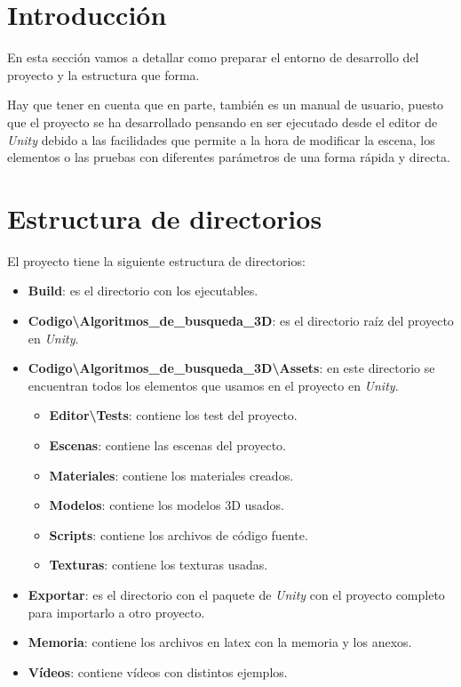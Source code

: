 
\section{Introducción}
En esta sección vamos a detallar como preparar el entorno de desarrollo del proyecto y la estructura que forma.

Hay que tener en cuenta que en parte, también es un manual de usuario, puesto que el proyecto se ha desarrollado pensando en ser ejecutado desde el editor de \textit{Unity} debido a las facilidades que permite a la hora de modificar la escena, los elementos o las pruebas con diferentes parámetros de una forma rápida y directa.

\section{Estructura de directorios}
El proyecto tiene la siguiente estructura de directorios:

\begin{itemize}
\item \textbf{Build}: es el directorio con los ejecutables.
\item \textbf{Codigo\textbackslash Algoritmos\_de\_busqueda\_3D}: es el directorio raíz del proyecto en \textit{Unity}.
\item \textbf{Codigo\textbackslash Algoritmos\_de\_busqueda\_3D\textbackslash Assets}: en este directorio se encuentran todos los elementos que usamos en el proyecto en \textit{Unity}.
	\begin{itemize}
	\item \textbf{Editor\textbackslash Tests}: contiene los test del proyecto.
	\item \textbf{Escenas}: contiene las escenas del proyecto.
	\item \textbf{Materiales}: contiene los materiales creados.
	\item \textbf{Modelos}: contiene los modelos 3D usados.
	\item \textbf{Scripts}: contiene los archivos de código fuente.
	\item \textbf{Texturas}: contiene los texturas usadas.
	\end{itemize}
\item \textbf{Exportar}: es el directorio con el paquete de \textit{Unity} con el proyecto completo para importarlo a otro proyecto.
\item \textbf{Memoria}: contiene los archivos en latex con la memoria y los anexos.
\item \textbf{Vídeos}: contiene vídeos con distintos ejemplos.
\end{itemize}

